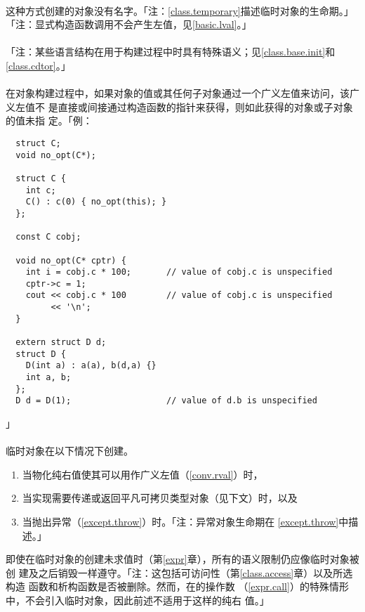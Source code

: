 \paragraph{}
这种方式创建的对象没有名字。「注：\ref{class.temporary}描述临时对象的生命期。」
「注：显式构造函数调用不会产生左值，见\ref{basic.lval}。」

\paragraph{}
「注：某些语言结构在用于构建过程中时具有特殊语义；见\ref{class.base.init}和
\ref{class.cdtor}。」

\paragraph{}
在对象构建过程中，如果对象的值或其任何子对象通过一个广义左值来访问，该广义左值不
是直接或间接通过构造函数的指针来获得，则如此获得的对象或子对象的值未指
定。「例：
\begin{lstlisting}
  struct C;
  void no_opt(C*);

  struct C {
    int c;
    C() : c(0) { no_opt(this); }
  };

  const C cobj;

  void no_opt(C* cptr) {
    int i = cobj.c * 100;       // value of cobj.c is unspecified
    cptr->c = 1;
    cout << cobj.c * 100        // value of cobj.c is unspecified
         << '\n';
  }

  extern struct D d;
  struct D {
    D(int a) : a(a), b(d,a) {}
    int a, b;
  };
  D d = D(1);                   // value of d.b is unspecified
\end{lstlisting}」

\paragraph{}
临时对象在以下情况下创建。
\begin{enumerate}
  \item{当物化纯右值使其可以用作广义左值（\ref{conv.rval}）时，}
  \item{当实现需要传递或返回平凡可拷贝类型对象（见下文）时，以及}
  \item{当抛出异常（\ref{except.throw}）时。「注：异常对象生命期在
    \ref{except.throw}中描述。」}
\end{enumerate}
即使在临时对象的创建未求值时（第\ref{expr}章），所有的语义限制仍应像临时对象被创
建及之后销毁一样遵守。「注：这包括可访问性（第\ref{class.access}章）以及所选构造
函数和析构函数是否被删除。然而，在的操作数
（\ref{expr.call}）的特殊情形中，不会引入临时对象，因此前述不适用于这样的纯右
值。」

